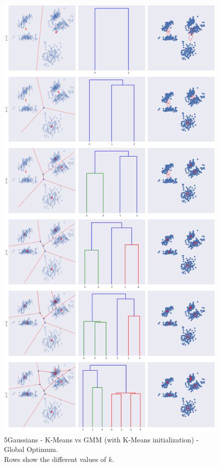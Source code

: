 \documentclass[a4paper,11pt]{article}
\begin{document}
\begin{figure}
    \centering
    \includegraphics[scale=0.23]{../images/assignment7_kmeans_init.png}
    \caption{\small{5Gaussians - K-Means vs GMM (with K-Means initialization) - Global Optimum.
            \\ Rows show the different values of $k$.
}}
\end{figure}
\end{document}
